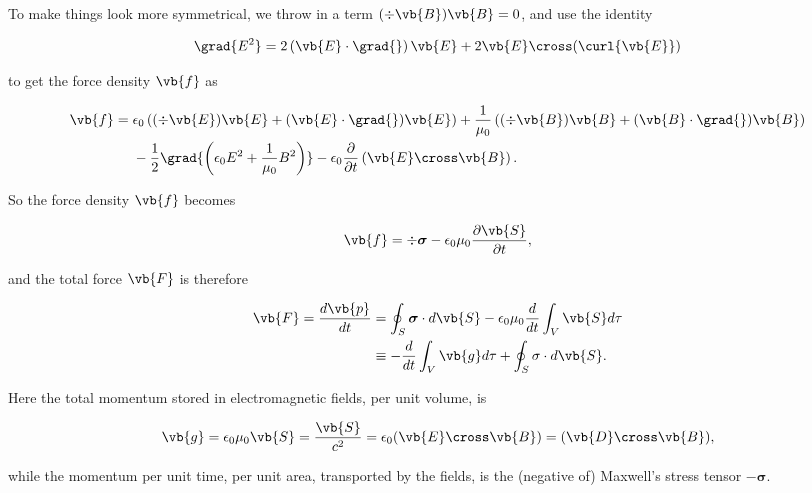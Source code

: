 \documentclass[english,a4paper,12pt]{report}
\begin{document}
To make things look more symmetrical, we throw in a term \((\div{\vb{B} } )\vb{B} =0\), and use the identity 

\begin{equation}
    \grad{E^2} = 2\left( \vb{E} \cdot \grad{}  \right) \vb{E} +2\vb{E} \cross (\curl{\vb{E} } )
\end{equation}

to get the force density \(\vb{f} \) as 

\begin{equation}
    \begin{aligned}
       \vb{f}  &= \epsilon_0 \left( (\div{\vb{E} } )\vb{E} + (\vb{E} \cdot \grad{} )\vb{E}  \right) + \frac{1}{\mu_0 } \left( (\div{\vb{B} } )\vb{B}  + (\vb{B} \cdot \grad{} )\vb{B}  \right) \\
        &~~~~ - \frac{1}{2} \grad{\left( \epsilon_0 E^2 + \frac{1}{\mu_0 }B^2 \right)} - \epsilon_0 \frac{\partial }{\partial t} \left( \vb{E} \cross \vb{B}  \right).
        \end{aligned}
\end{equation}

So the force density \(\vb{f} \) becomes

\begin{equation}
    \vb{f} = \div{\boldsymbol{\sigma } } - \epsilon_0 \mu_0 \frac{\partial \vb{S} }{\partial t},    
\end{equation}

and the total force \(\vb{F} \) is therefore

\begin{equation}
    \begin{aligned} 
    \vb{F} = \frac{d\vb{p} }{dt} &= \oint_{S} \boldsymbol{\sigma } \cdot d\vb{S} - \epsilon_0 \mu_0 \frac{d}{dt} \int_{V}^{} \vb{S} d\tau \\
    &\equiv - \frac{d}{dt} \int_{V}^{} \vb{g}  d\tau + \oint_{S} \sigma \cdot d\vb{S} .
    \end{aligned}   
\end{equation}

Here the total momentum stored in electromagnetic fields, per unit volume, is 

\begin{equation}
    \vb{g} = \epsilon_0 \mu_0 \vb{S} = \frac{\vb{S} }{c^2} = \epsilon_0 (\vb{E} \cross \vb{B} ) = (\vb{D} \cross \vb{B} ), 
\end{equation}

while the momentum per unit time, per unit area, transported by the fields, is the (negative of) Maxwell's stress tensor \(-\boldsymbol{\sigma } \). 
\end{document}
